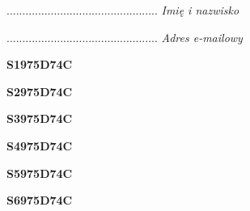 \begin{turn}{90}\begin{minipage}{\linewidth} \vspace{20mm} ................................................  \textit{Imię i nazwisko}\end{minipage}\end{turn}

\begin{turn}{90}\begin{minipage}{\linewidth} \vspace{20mm} ................................................  \textit{Adres e-mailowy}\end{minipage}\end{turn}

\begin{turn}{90}\huge \begin{minipage}{\linewidth} \vspace{10mm}\textbf{S1975D74C}\end{minipage}\end{turn}

\begin{turn}{90}\huge \begin{minipage}{\linewidth} \vspace{10mm}\textbf{S2975D74C}\end{minipage}\end{turn}

\begin{turn}{90}\huge \begin{minipage}{\linewidth} \vspace{10mm}\textbf{S3975D74C}\end{minipage}\end{turn}

\begin{turn}{90}\huge \begin{minipage}{\linewidth} \vspace{10mm}\textbf{S4975D74C}\end{minipage}\end{turn}

\begin{turn}{90}\huge \begin{minipage}{\linewidth} \vspace{10mm}\textbf{S5975D74C}\end{minipage}\end{turn}

\begin{turn}{90}\huge \begin{minipage}{\linewidth} \vspace{10mm}\textbf{S6975D74C}\end{minipage}\end{turn}

